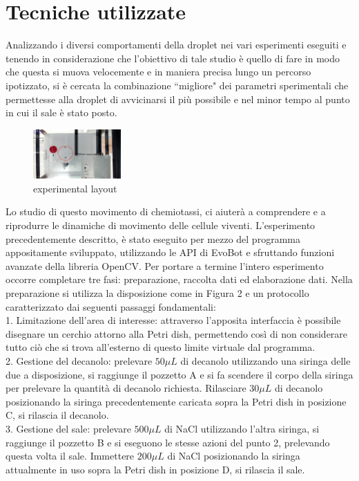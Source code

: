 \section{Tecniche utilizzate}
Analizzando i diversi comportamenti della droplet nei vari esperimenti eseguiti e tenendo in considerazione che l'obiettivo di tale studio è quello di fare in modo che questa si muova velocemente e in maniera precisa lungo un percorso ipotizzato, si è cercata la combinazione ``migliore" dei parametri sperimentali che permettesse alla droplet di avvicinarsi il più possibile e nel minor tempo al punto in cui il sale è stato posto. 
\begin{figure}
\begin{center}
	  \includegraphics[width=0.3\textwidth]{immagini/exp1.jpg}
\end{center}
	 \caption{experimental layout}
\end{figure} 
Lo studio di questo movimento di chemiotassi, ci aiuterà a comprendere e a riprodurre le dinamiche di movimento delle cellule viventi. 
L'esperimento precedentemente descritto, è stato eseguito per mezzo del programma appositamente sviluppato, utilizzando le API di EvoBot e sfruttando funzioni avanzate della libreria OpenCV. 
Per portare a termine l'intero esperimento occorre completare tre fasi: preparazione, raccolta dati ed elaborazione dati. 
Nella preparazione si utilizza la disposizione come in Figura 2 e un protocollo caratterizzato dai seguenti passaggi fondamentali:
\\1. Limitazione dell'area di interesse: attraverso l’apposita interfaccia è possibile disegnare un cerchio attorno alla Petri dish, permettendo così di non considerare tutto ciò che si trova all'esterno di questo limite virtuale dal programma.
\\2. Gestione del decanolo: prelevare $50\mu L$ di decanolo utilizzando una siringa delle due a disposizione, si raggiunge il pozzetto A e si fa scendere il corpo della siringa per prelevare la quantità di decanolo richiesta. Rilasciare $30\mu L$ di decanolo posizionando la siringa precedentemente caricata sopra la Petri dish in posizione C, si rilascia il decanolo. 
\\3. Gestione del sale: prelevare $500\mu L$ di NaCl utilizzando l'altra siringa, si raggiunge il pozzetto B e si eseguono le stesse azioni del punto 2, prelevando questa volta il sale. Immettere $200\mu L$ di NaCl posizionando la siringa attualmente in uso sopra la Petri dish in posizione D, si rilascia il sale. 
